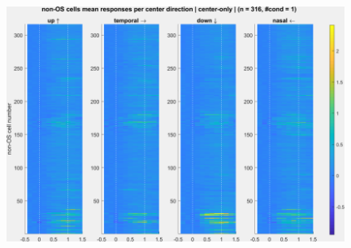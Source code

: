 %
%

\begin{figure}[H] \centering \includegraphics[width=11cm,height=11cm,keepaspectratio]{Figures/7.Results/population/sel/10_popPlots_nonOS_centerOnly.png} 
\end{figure}

